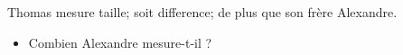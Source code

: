 \documentclass[exercice]{thedocument}%
\begin{document}
%
    Thomas mesure \<taille; soit \<difference; de plus que son frère Alexandre.
    \begin{itemize}
        \item Combien Alexandre mesure-t-il ?
    \end{itemize}
\end{document}
